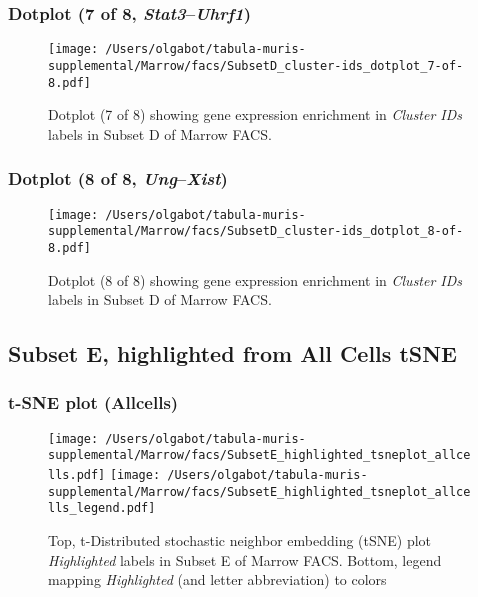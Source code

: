 \clearpage

\subsubsection{Dotplot (7 of 8, \emph{Stat3}--\emph{Uhrf1})}
\begin{figure}[h]
\centering
\texttt{[image: /Users/olgabot/tabula-muris-supplemental/Marrow/facs/SubsetD\_cluster-ids\_dotplot\_7-of-8.pdf]}

\caption{ Dotplot (7 of 8)  showing gene expression enrichment in \emph{Cluster IDs} labels in Subset D of Marrow FACS. }
\end{figure}


\clearpage

\subsubsection{Dotplot (8 of 8, \emph{Ung}--\emph{Xist})}
\begin{figure}[h]
\centering
\texttt{[image: /Users/olgabot/tabula-muris-supplemental/Marrow/facs/SubsetD\_cluster-ids\_dotplot\_8-of-8.pdf]}

\caption{ Dotplot (8 of 8)  showing gene expression enrichment in \emph{Cluster IDs} labels in Subset D of Marrow FACS. }
\end{figure}


\clearpage
\subsection{Subset E, highlighted from All Cells tSNE}
\subsubsection{t-SNE plot (Allcells)}
\begin{figure}[h]
\centering
\texttt{[image: /Users/olgabot/tabula-muris-supplemental/Marrow/facs/SubsetE\_highlighted\_tsneplot\_allcells.pdf]}
\texttt{[image: /Users/olgabot/tabula-muris-supplemental/Marrow/facs/SubsetE\_highlighted\_tsneplot\_allcells\_legend.pdf]}
\caption{Top, t-Distributed stochastic neighbor embedding (tSNE) plot  \emph{Highlighted} labels in Subset E of Marrow FACS. Bottom, legend mapping \emph{Highlighted} (and letter abbreviation) to colors}
\end{figure}


\clearpage

